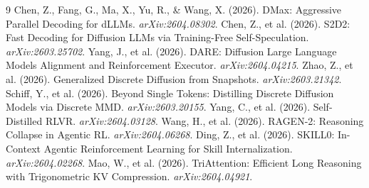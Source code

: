 \documentclass[11pt]{article}
\begin{document}
\begin{thebibliography}{9}
 Chen, Z., Fang, G., Ma, X., Yu, R., \& Wang, X. (2026). DMax: Aggressive Parallel Decoding for dLLMs. \textit{arXiv:2604.08302}.
 Chen, Z., et al. (2026). S2D2: Fast Decoding for Diffusion LLMs via Training-Free Self-Speculation. \textit{arXiv:2603.25702}.
 Yang, J., et al. (2026). DARE: Diffusion Large Language Models Alignment and Reinforcement Executor. \textit{arXiv:2604.04215}.
 Zhao, Z., et al. (2026). Generalized Discrete Diffusion from Snapshots. \textit{arXiv:2603.21342}.
 Schiff, Y., et al. (2026). Beyond Single Tokens: Distilling Discrete Diffusion Models via Discrete MMD. \textit{arXiv:2603.20155}.
 Yang, C., et al. (2026). Self-Distilled RLVR. \textit{arXiv:2604.03128}.
 Wang, H., et al. (2026). RAGEN-2: Reasoning Collapse in Agentic RL. \textit{arXiv:2604.06268}.
 Ding, Z., et al. (2026). SKILL0: In-Context Agentic Reinforcement Learning for Skill Internalization. \textit{arXiv:2604.02268}.
 Mao, W., et al. (2026). TriAttention: Efficient Long Reasoning with Trigonometric KV Compression. \textit{arXiv:2604.04921}.
\end{thebibliography}
\end{document}
